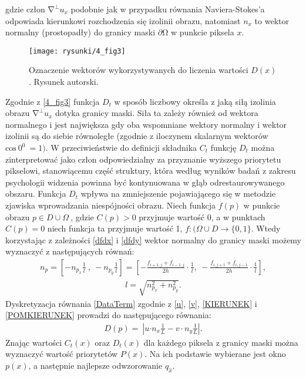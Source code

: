 \documentclass[12pt, twoside, openany]{report}
\theoremstyle{definition}
\begin{document}
gdzie człon ${\mathrm{\nabla }}^{\bot }u_x$ podobnie jak w przypadku równania Naviera-Stokes'a odpowiada kierunkowi rozchodzenia się izolinii obrazu, natomiast  $n_x$ to wektor normalny (prostopadły) do granicy maski $\partial \mathrm{\Omega }$ w punkcie piksela $x$.
\begin{figure}[!h]
	\centering
	\texttt{[image: rysunki/4\_fig3]}
	\caption{Oznaczenie wektorów wykorzystywanych do liczenia wartości $D(x)$. Rysunek autorski.}
	\label{4_fig3} 
\end{figure}
Zgodnie z \autoref{4_fig3} funkcja $D_t$ w sposób liczbowy określa z jaką siłą izolinia obrazu ${\mathrm{\nabla }}^{\bot }u_x$ dotyka granicy maski. Siła ta zależy również od wektora normalnego i jest największa gdy oba wspomniane wektory normalny i wektor izolinii są do siebie równoległe (zgodnie z iloczynem skalarnym wektorów ${\mathrm{cos} \ 0^0\ }=1)$.
W przeciwieństwie do definicji składnika $C_t$ funkcję $D_t$ można zinterpretować jako człon odpowiedzialny za przyznanie wyższego priorytetu pikselowi, stanowiącemu część struktury, która według wyników badań z zakresu psychologii widzenia powinna być kontynuowana w głąb odrestaurowywanego obszaru. Funkcja $D_t$ wpływa na zmniejszenie pojawiającego się w metodzie zjawiska wprowadzania niespójności obrazu. Niech funkcja $f(p)$ w punkcie obrazu $p \in D \cup \Omega \ $, gdzie $C(p) > 0$ przyjmuje wartość 0, a w punktach $C(p) = 0$ niech funkcja ta przyjmuje wartość 1, $f : (\Omega \cup D \to \{0,1\}$.  Wtedy korzystając z zależności \eqref{dfdx} i \eqref{dfdy} wektor normalny do granicy maski możemy wyznaczyć z następujących równań:
\begin{align}
n_p= \left[-n_{p_x}\frac{1}{l}\ ,\ -n_{p_y} \frac{1}{l}\right] =\left[-\frac{f_{i+1,j}+f_{i-1,j}}{2h}\cdot \frac{1}{l}, \  -\frac{f_{i,j+1} + f_{i,j-1}}{2h} \cdot \frac{1}{l}\right],
\label{KIERUNEK}
\end{align}
\begin{align}
l= \sqrt{n^2_{p_x} + n^2_{p_y}}.
\label{POMKIERUNEK}
\end{align}
Dyskretyzacja równania \eqref{DataTerm} zgodnie z \eqref{u}, \eqref{v}, \eqref{KIERUNEK} i \eqref{POMKIERUNEK} prowadzi do następującego równania:
\begin{align}
D(p)=\ \left|u{\cdot n}_x\frac{1}{L}-v\cdot n_y\frac{1}{L}\right|.
\end{align}
Znając wartości $C_t\left(x\right)$ oraz $D_t(x)$ dla każdego piksela z granicy maski można wyznaczyć wartość priorytetów $P(x)$. Na ich podstawie wybierane jest okno $p(x)$, a następnie najlepsze odwzorowanie $q_{\hat{x}}$.
\end{document}
